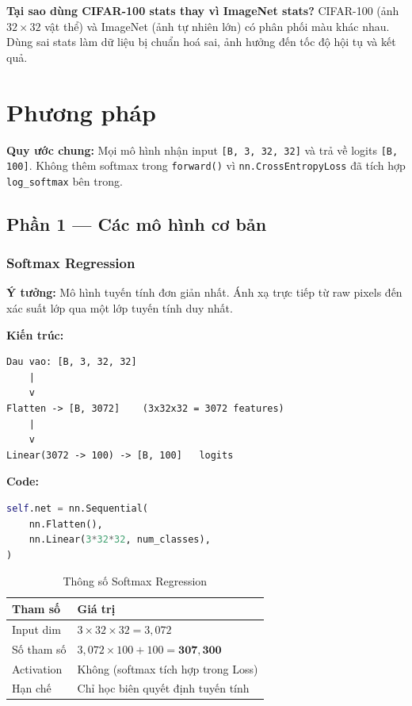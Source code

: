 \documentclass[12pt, a4paper]{article}
\begin{document}
\begin{myquote}
\textbf{Tại sao dùng CIFAR-100 stats thay vì ImageNet stats?} CIFAR-100 (ảnh $32\times32$ vật thể) và ImageNet (ảnh tự nhiên lớn) có phân phối màu khác nhau. Dùng sai stats làm dữ liệu bị chuẩn hoá sai, ảnh hưởng đến tốc độ hội tụ và kết quả.
\end{myquote}

\section{Phương pháp}

\textbf{Quy ước chung:} Mọi mô hình nhận input \texttt{[B, 3, 32, 32]} và trả về logits \texttt{[B, 100]}. Không thêm softmax trong \texttt{forward()} vì \texttt{nn.CrossEntropyLoss} đã tích hợp \texttt{log\_softmax} bên trong.

\subsection{Phần 1 --- Các mô hình cơ bản}

\subsubsection{Softmax Regression}

\textbf{Ý tưởng:} Mô hình tuyến tính đơn giản nhất. Ánh xạ trực tiếp từ raw pixels đến xác suất lớp qua một lớp tuyến tính duy nhất.

\textbf{Kiến trúc:}
\begin{lstlisting}[style=plainstyle]
Dau vao: [B, 3, 32, 32]
    |
    v
Flatten -> [B, 3072]    (3x32x32 = 3072 features)
    |
    v
Linear(3072 -> 100) -> [B, 100]   logits
\end{lstlisting}

\textbf{Code:}
\begin{lstlisting}[language=Python]
self.net = nn.Sequential(
    nn.Flatten(),
    nn.Linear(3*32*32, num_classes),
)
\end{lstlisting}

\begin{table}[H]
\centering
\caption{Thông số Softmax Regression}
\begin{tabular}{ll}
\toprule
\textbf{Tham số} & \textbf{Giá trị} \\
\midrule
Input dim      & $3 \times 32 \times 32 = 3{,}072$ \\
Số tham số     & $3{,}072 \times 100 + 100 = \mathbf{307{,}300}$ \\
Activation     & Không (softmax tích hợp trong Loss) \\
Hạn chế        & Chỉ học biên quyết định tuyến tính \\
\bottomrule
\end{tabular}
\end{table}
\end{document}
